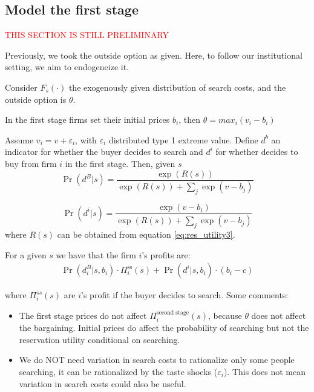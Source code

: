 \documentclass[12pt]{article}
\theoremstyle{plain}
\theoremstyle{plain}
\begin{document}
\subsection{Model the first stage}

\textcolor{red}{THIS SECTION IS STILL PRELIMINARY}

Previously, we took the outside option as given. Here, to follow our institutional setting, we aim to endogeneize it. 

Consider  \( F_s(\cdot) \) the exogenously given distribution of search costs, and the outside option is \( \theta \).  

In the first stage firms set their initial prices $b_i$, then $\theta = max_i(v_i - b_i)$



Assume $v_i = v + \varepsilon_i $, with $\varepsilon_i$ distributed type 1 extreme value. Define $d^b$ an indicator for whether the buyer decides to search and $d^i$ for whether decides to buy from firm $i$ in the first stage. Then, given $s$ 
\[
\Pr(d^B|s) = \frac{\exp(R(s))}{\exp(R(s)) + \sum_j \exp(v - b_j)}
\]


\[
\Pr(d^i|s) = \frac{\exp(v - b_i)}{\exp(R(s)) + \sum_j \exp(v - b_j)}
\]
where  $R(s)$ can be obtained from  equation \ref{eq:res_utility3}.


For a given $s$ we have that the firm $i$'s profits are: 
\begin{align}\label{eq:profits}
    \Pr(d^B_i|s,b_i) \cdot     \Pi^{\text{ss}}_i(s) + \Pr(d^i|s, b_i) \cdot (b_i - c)    
\end{align}

where $\Pi^{ss}_i(s)$ are $i$'s profit if the buyer decides to search.
Some comments: 
\begin{itemize}
    \item The first stage prices do not affect $\Pi^{\text{second stage}}_i(s)$, because $\theta$ does not affect the bargaining. Initial prices do affect the probability of searching but not the reservation utility conditional on searching.  
    \item We do NOT need variation in search costs to rationalize only some people searching, it can be rationalized by the taste shocks ($\varepsilon_i$). This does not mean variation in search costs could also be useful. 
\end{itemize}
\end{document}
